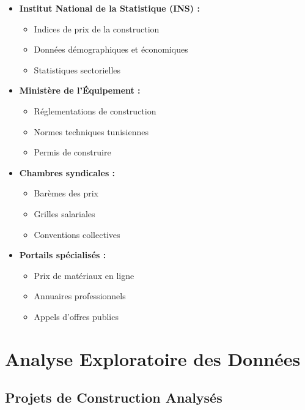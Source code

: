 \documentclass[12pt, a4paper]{report}
\begin{document}
\begin{itemize}
    \item \textbf{Institut National de la Statistique (INS) :}
    \begin{itemize}
        \item Indices de prix de la construction
        \item Données démographiques et économiques
        \item Statistiques sectorielles
    \end{itemize}
    
    \item \textbf{Ministère de l'Équipement :}
    \begin{itemize}
        \item Réglementations de construction
        \item Normes techniques tunisiennes
        \item Permis de construire
    \end{itemize}
    
    \item \textbf{Chambres syndicales :}
    \begin{itemize}
        \item Barèmes des prix
        \item Grilles salariales
        \item Conventions collectives
    \end{itemize}
    
    \item \textbf{Portails spécialisés :}
    \begin{itemize}
        \item Prix de matériaux en ligne
        \item Annuaires professionnels
        \item Appels d'offres publics
    \end{itemize}
\end{itemize}

\section{Analyse Exploratoire des Données}

\subsection{Projets de Construction Analysés}
\end{document}
